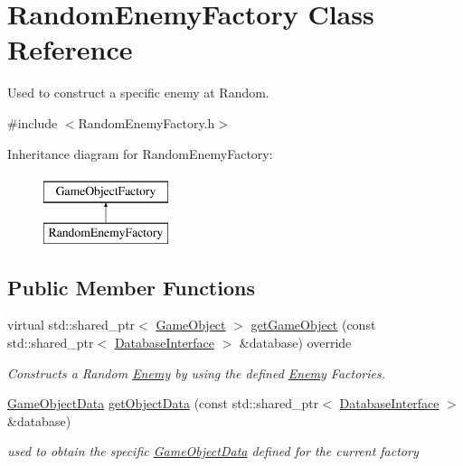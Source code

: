\hypertarget{class_random_enemy_factory}{}\section{Random\+Enemy\+Factory Class Reference}
\label{class_random_enemy_factory}


Used to construct a specific enemy at Random.  




{\ttfamily \#include $<$Random\+Enemy\+Factory.\+h$>$}

Inheritance diagram for Random\+Enemy\+Factory\+:\begin{figure}[H]
\begin{center}
\leavevmode
\includegraphics[height=2.000000cm]{df/def/class_random_enemy_factory}
\end{center}
\end{figure}
\subsection*{Public Member Functions}
\begin{DoxyCompactItemize}
\item 
virtual std\+::shared\+\_\+ptr$<$ \hyperlink{class_game_object}{Game\+Object} $>$ \hyperlink{class_random_enemy_factory_a5099fcf010a5cf2f53fd7c874a1925a9}{get\+Game\+Object} (const std\+::shared\+\_\+ptr$<$ \hyperlink{class_database_interface}{Database\+Interface} $>$ \&database) override
\begin{DoxyCompactList}\small\item\em Constructs a Random \hyperlink{class_enemy}{Enemy} by using the defined \hyperlink{class_enemy}{Enemy} Factories. \end{DoxyCompactList}\item 
\hyperlink{struct_game_object_data}{Game\+Object\+Data} \hyperlink{class_random_enemy_factory_a7c007b44a5e5e59fecc0b8cd2a6a9dc3}{get\+Object\+Data} (const std\+::shared\+\_\+ptr$<$ \hyperlink{class_database_interface}{Database\+Interface} $>$ \&database)
\begin{DoxyCompactList}\small\item\em used to obtain the specific \hyperlink{struct_game_object_data}{Game\+Object\+Data} defined for the current factory \end{DoxyCompactList}\end{DoxyCompactItemize}
